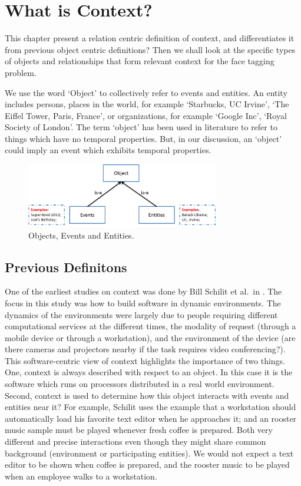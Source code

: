 \chapter{What is Context?}

This chapter present a relation centric definition of context, and differentiates it from previous object centric definitions? Then we shall look at the specific types of objects and relationships that form relevant context for the face tagging problem.

We use the word `Object' to collectively refer to events and entities. An entity includes persons, places in the world, for example `Starbucks, UC Irvine', `The Eiffel Tower, Paris, France', or organizations, for example `Google Inc', `Royal Society of London'. The term `object' has been used in literature to refer to things which have no temporal properties. But, in our discussion, an `object' could imply an event which exhibits temporal properties.

\begin{figure}[h]
\centering
\includegraphics[width=0.75\textwidth]{media/chapter1/terminology.png}
\caption{Objects, Events and Entities.}
\label{fig:terminology}
\end{figure}

\section{Previous Definitons}

One of the earliest studies on context was done by Bill Schilit et al.\ in \cite{schilit1994context}. The focus in this study was how to build software in dynamic environments. The dynamics of the environments were largely due to people requiring different computational services at the different times, the modality of request (through a mobile device or through a workstation), and the environment of the device (are there cameras and projectors nearby if the task requires video conferencing?). This software-centric view of context highlights the importance of two things. One, context is always described with respect to an object. In this case it is the software which runs on processors distributed in a real world environment. Second, context is used to determine how this object interacts with events and entities near it? For example, Schilit uses the example that a workstation should automatically load his favorite text editor when he approaches it; and an rooster music sample must be played whenever fresh coffee is prepared. Both very different and precise interactions even though they might share common background (environment or participating entities). We would not expect a text editor to be shown when coffee is prepared, and the rooster music to be played when an employee walks to a workstation.

